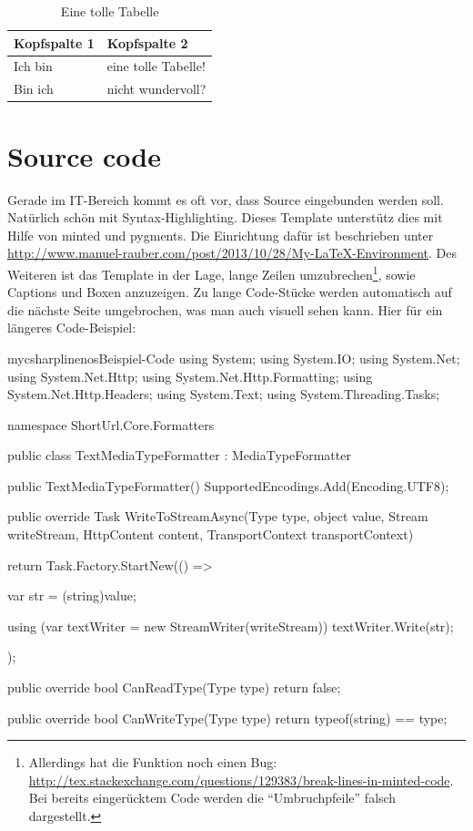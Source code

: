 \begin{table}[H]
\centering
\begin{tabular}{ll}
	\textbf{Kopfspalte 1} & \textbf{Kopfspalte 2} \\ \hline\hline
	Ich bin               & eine tolle Tabelle!   \\ \hline
	Bin ich               & nicht wundervoll?
\end{tabular}
\caption{Eine tolle Tabelle}
\end{table}

\section{Source code}

Gerade im IT-Bereich kommt es oft vor, dass Source eingebunden werden soll. Natürlich schön mit Syntax-Highlighting. 
Dieses Template unterstütz dies mit Hilfe von minted und pygments. Die Einrichtung dafür ist beschrieben unter \url{http://www.manuel-rauber.com/post/2013/10/28/My-LaTeX-Environment}.
Des Weiteren ist das Template in der Lage, lange Zeilen umzubrechen\footnote{Allerdings hat die Funktion noch einen Bug: \url{http://tex.stackexchange.com/questions/129383/break-lines-in-minted-code}. Bei bereits eingerücktem Code werden die \enquote{Umbruchpfeile} falsch dargestellt.}, sowie Captions und Boxen anzuzeigen. Zu lange Code-Stücke werden automatisch auf die nächste Seite umgebrochen, was man auch visuell sehen kann. Hier für ein längeres Code-Beispiel:

\begin{listingsbox}{mycsharplinenos}{Beispiel-Code}
using System;
using System.IO;
using System.Net;
using System.Net.Http;
using System.Net.Http.Formatting;
using System.Net.Http.Headers;
using System.Text;
using System.Threading.Tasks;

namespace ShortUrl.Core.Formatters
{
	public class TextMediaTypeFormatter : MediaTypeFormatter
	{
		public TextMediaTypeFormatter()
		{
			SupportedEncodings.Add(Encoding.UTF8);
		}

		public override Task WriteToStreamAsync(Type type, object value, Stream writeStream, HttpContent content,
			TransportContext transportContext)
		{
			return Task.Factory.StartNew(() =>
			{

				var str = (string)value;

				using (var textWriter = new StreamWriter(writeStream))
				{
					textWriter.Write(str);
				}
			});
		}

		public override bool CanReadType(Type type)
		{
			return false;
		}

		public override bool CanWriteType(Type type)
		{
			return typeof(string) == type;
		}
	}
}
\end{listingsbox}
